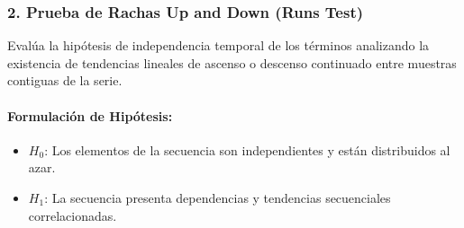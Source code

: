 \documentclass{article}
\begin{document}
\subsubsection{2. Prueba de Rachas Up and Down (Runs Test)}
Evalúa la hipótesis de independencia temporal de los términos analizando la existencia de tendencias lineales de ascenso o descenso continuado entre muestras contiguas de la serie.

\paragraph{Formulación de Hipótesis:}
\begin{itemize}
    \item $H_0$: Los elementos de la secuencia son independientes y están distribuidos al azar.
    \item $H_1$: La secuencia presenta dependencias y tendencias secuenciales correlacionadas.
\end{itemize}
\end{document}
